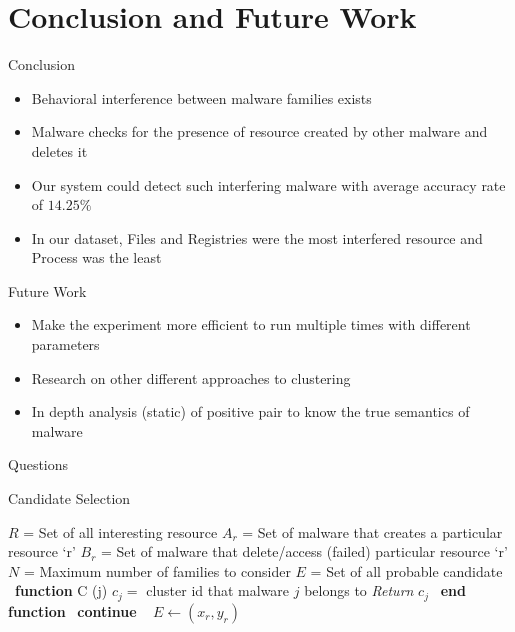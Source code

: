 \documentclass[]{beamer}
\begin{document}
\section{Conclusion and Future Work}
\begin{frame}{Conclusion}
  \begin{itemize}
    \item Behavioral interference between malware families exists
    \item Malware checks for the presence of resource created by other malware and deletes it
    \item Our system could detect such interfering malware with average accuracy rate of $14.25\%$
    \item In our dataset, Files and Registries were the most interfered resource and Process was the least
  \end{itemize}
\end{frame}
\begin{frame}{Future Work}
  \begin{itemize}
    \item Make the experiment more efficient to run multiple times with different parameters
    \item Research on other different approaches to clustering
    \item In depth analysis (static) of positive pair to know the true semantics of malware
  \end{itemize}
\end{frame}
\begin{frame}{Questions}
  
\end{frame}
\appendix
\begin{frame}[plain]{Candidate Selection}
\begin{algorithm}[H]
  \small
  \begin{algorithmic}[1]
    \STATE$R$   = Set of all interesting resource
    \STATE$A_r$ = Set of malware that creates a particular resource `r'
    \STATE$B_r$ = Set of malware that delete/access (failed) particular resource `r'
    \STATE$N$   = Maximum number of families to consider
    \STATE$E$   = Set of all probable candidate
    \STATE\ \textbf{function} C (j)
      \STATE\hspace{\algorithmicindent} $c_j =$ cluster id that malware $j$ belongs to
      \STATE\hspace{\algorithmicindent} \textit{Return} $c_j$
    \STATE\ \textbf{end function}
        \STATE\ \textbf{continue}
      \ENDIF\
          \STATE$E\gets (x_r, y_r)$
        \ENDIF\
      \ENDFOR\
    \ENDFOR\
  \end{algorithmic}
\end{algorithm}
\end{frame}
\end{document}
